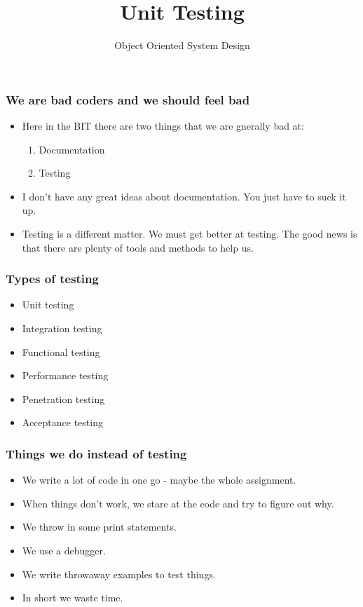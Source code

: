 \documentclass[10pt]{beamer}
\title{Unit Testing}
\author[IN710]{Object Oriented System Design}
\institute[Otago Polytechnic]{
  Otago Polytechnic \\
  Dunedin, New Zealand \\
}
\date{}
\begin{document}
\begin{frame}[plain]
  \titlepage
\end{frame}

\begin{frame}
  \frametitle{We are bad coders and we should feel bad}

 \begin{itemize}
  \item Here in the BIT there are two things that we are gnerally bad at:
	  \begin{enumerate}
		  \item Documentation
		  \item Testing
	  \end{enumerate}
  \item I don't have any great ideas about documentation.  You just
	  have to suck it up.
  \item Testing is a different matter.  We must get better at testing. The
	  good news is that there are plenty of tools and methods to help us.
  \end{itemize}
\end{frame}

\begin{frame}
	\frametitle{Types of testing}
	\begin{itemize}
		\item Unit testing
		\item Integration testing
		\item Functional testing
		\item Performance testing
		\item Penetration testing
		\item Acceptance testing
	\end{itemize}
\end{frame}

\begin{frame}
	\frametitle{Things we do instead of testing}
	\begin{itemize}
		\item We write a lot of code in one go - maybe the whole assignment.
		\item When things don't work, we stare at the code and
			try to figure out why.
		\item We throw in some print statements.
		\item We use a debugger.
		\item We write throwaway examples to test things.
		\item In short we waste time.
	\end{itemize}
\end{frame}
\end{document}
